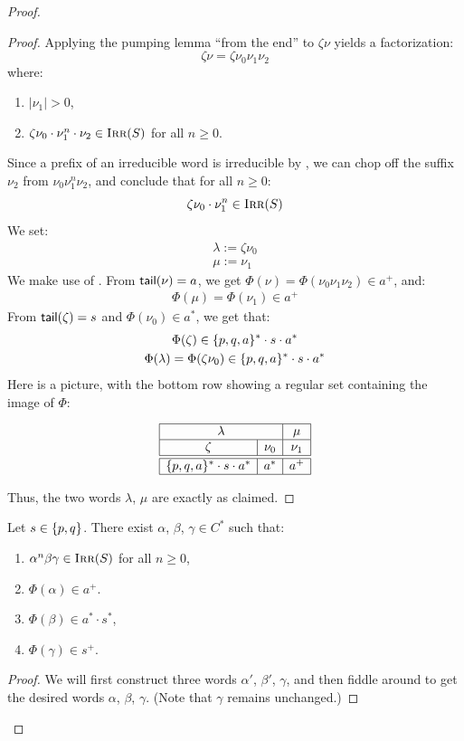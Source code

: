 \documentclass[../generics]{subfiles}
\begin{document}
\begin{proof}
\begin{proof}
Applying the pumping lemma ``from the end'' to $\zeta \nu$ yields a factorization:
\[\zeta \nu = \zeta \nu_0 \nu_1 \nu_2\]
where:
\begin{enumerate}
\item $|\nu_1| > 0$,
\item $\zeta \nu_0 \cdot \nu_1^n \cdot \nu_2 \in \textsc{Irr}(S)$ for all $n \geq 0$.
\end{enumerate}
Since a prefix of an irreducible word is irreducible by , we can chop off the suffix $\nu_2$ from $\nu_0 \nu_1^n \nu_2$, and conclude that for all $n \geq 0$:
\[
\zeta \nu_0 \cdot \nu_1^n \in \textsc{Irr}(S)
\]
We set:
\begin{gather*}
\lambda := \zeta \nu_0 \\
\mu := \nu_1
\end{gather*}
We make use of . From $\mathsf{tail}(\nu) = a$, we get $\Phi(\nu) = \Phi(\nu_0\nu_1\nu_2) \in a^+$, and:
\begin{gather*}
\Phi(\mu) = \Phi(\nu_1) \in a^+
\end{gather*}
From $\mathsf{tail}(\zeta)=s$ and $\Phi(\nu_0) \in a^*$, we get that:
\begin{gather*}
\Phi(\zeta) \in \{p,q,a\}^* \cdot s \cdot a^* \\
\Phi(\lambda) = \Phi(\zeta \nu_0) \in \{p,q,a\}^* \cdot s \cdot a^*
\end{gather*}
Here is a picture, with the bottom row showing a regular set containing the image of $\Phi$:
\begin{ceqn}
\[
\begin{array}{|c|c|c|}
\hline
\multicolumn{2}{|c|}{\lambda} & \mu \\
\hline
\zeta & \nu_0 & \nu_1 \\
\hline
\hline
\PQA^* \cdot s \cdot a^* & a^* & a^+ \\
\hline
\end{array}
\]
\end{ceqn}
Thus, the two words $\lambda$, $\mu$ are exactly as claimed.
\end{proof}

\begin{lemma}\label{lemma:tpqa second pump}
Let $s \in \{p,q\}$. There exist $\alpha$, $\beta$, $\gamma \in C^*$ such that:
\begin{enumerate}
\item $\alpha^n \beta \gamma \in \textsc{Irr}(S)$ for all $n \geq 0$,
\item $\Phi(\alpha) \in a^+$.
\item $\Phi(\beta) \in a^* \cdot s^*$,
\item $\Phi(\gamma) \in s^+$.
\end{enumerate}
\end{lemma}
\begin{proof}
\renewcommand{\arraystretch}{1.3}
We will first construct three words $\alpha'$, $\beta'$, $\gamma$, and then fiddle around to get the desired words $\alpha$, $\beta$, $\gamma$. (Note that $\gamma$ remains unchanged.)


\end{proof}
\end{proof}
\end{document}
